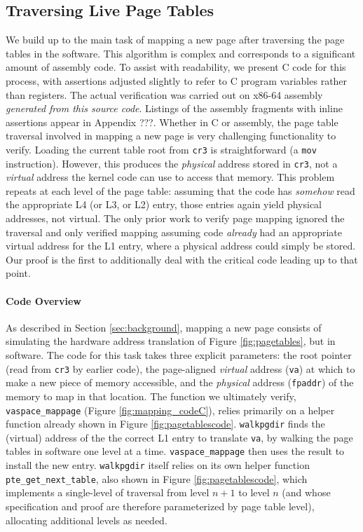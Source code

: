 \subsection{Traversing Live Page Tables}
\label{sec:traversing}
We build up to the main task of mapping a new page after traversing the page tables in the software.
This algorithm is complex and corresponds to a significant amount of assembly code.
To assist with readability, we present C code for this process, with assertions adjusted slightly to refer to
C program variables rather than registers. The actual verification was carried out on x86-64 assembly
\emph{generated from this source code}.
Listings of the assembly fragments with inline assertions appear in Appendix ???. %
Whether in C or assembly,
the page table traversal involved in mapping a new page is very challenging functionality to verify.
Loading the current table root from \lstinline|cr3| is straightforward (a \lstinline|mov| instruction).
However, this produces the \emph{physical} address stored in \lstinline|cr3|, not a \emph{virtual} address the kernel code can use to access that memory.
This problem repeats at each level of the page table: assuming that the code has \emph{somehow} read the appropriate L4 (or L3, or L2) entry, those entries again
yield physical addresses, not virtual.
The only prior work to verify page mapping ignored the traversal and only verified mapping
assuming code \emph{already} had an appropriate virtual address for the L1 entry, where a physical
address could simply be stored. Our proof is the first to additionally deal with the critical code
leading up to that point.

\paragraph{Code Overview}
As described in Section \ref{sec:background}, mapping a new page consists of 
simulating the hardware address translation of Figure \ref{fig:pagetables}, but in software.
The code for this task takes three explicit parameters:
the root pointer (read from \lstinline|cr3| by earlier code),
the page-aligned \emph{virtual} address (\lstinline|va|) at which to make a new piece of memory accessible,
and the \emph{physical} address (\lstinline|fpaddr|) of the memory to map in that location.
The function we ultimately verify, \lstinline|vaspace_mappage| (Figure \ref{fig:mapping_codeC}),
relies primarily on a helper function already shown in Figure \ref{fig:pagetablescode}.
\lstinline|walkpgdir| finds the (virtual) address of the the correct L1 entry to translate \lstinline|va|,
by walking the page tables in software one level at a time.
\lstinline|vaspace_mappage| then uses the result to install the new entry.
\lstinline|walkpgdir| itself relies on its own helper function \lstinline|pte_get_next_table|, also shown in Figure \ref{fig:pagetablescode},
which implements a single-level of traversal from level $n+1$ to level $n$ (and whose specification and proof are therefore
parameterized by page table level), allocating additional levels as needed.

